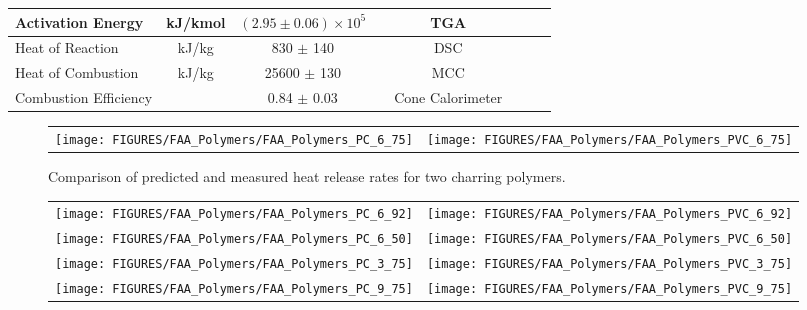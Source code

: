 \begin{table}[h!]
\begin{tabular}{|l|c|c|c|c|c|l|l|}
Activation Energy           & kJ/kmol       & $(2.95 \pm 0.06) \times 10^{5}$   &                       & TGA                   &  \cite{Stoliarov:CF2010}  \\ \hline
Heat of Reaction            & kJ/kg         & 830 $\pm$ 140                     &                       & DSC                   &  \cite{Stoliarov:PDS2008}  \\ \hline
Heat of Combustion          & kJ/kg         & 25600 $\pm$ 130                   &                       & MCC                   &  \cite{Stoliarov:CF2010}  \\ \hline
Combustion Efficiency       &               & 0.84 $\pm$ 0.03                   &                       & Cone Calorimeter      &  \cite{Stoliarov:CF2010}  \\ \hline
\end{tabular}
\label{FAA_Properties_Charring}
\end{table}

\begin{figure}[h!]
\begin{tabular*}{\textwidth}{l@{\extracolsep{\fill}}r}
\texttt{[image: FIGURES/FAA\_Polymers/FAA\_Polymers\_PC\_6\_75]} &
\texttt{[image: FIGURES/FAA\_Polymers/FAA\_Polymers\_PVC\_6\_75]}
\end{tabular*}
\caption[Results of FAA Polymers, charring, comparison]{Comparison of predicted and measured heat release rates for two charring polymers.}
\label{FAA_Polymers_Charring}
\end{figure}

\begin{figure}[p]
\begin{tabular*}{\textwidth}{l@{\extracolsep{\fill}}r}
\texttt{[image: FIGURES/FAA\_Polymers/FAA\_Polymers\_PC\_6\_92]} &
\texttt{[image: FIGURES/FAA\_Polymers/FAA\_Polymers\_PVC\_6\_92]}  \\
\texttt{[image: FIGURES/FAA\_Polymers/FAA\_Polymers\_PC\_6\_50]} &
\texttt{[image: FIGURES/FAA\_Polymers/FAA\_Polymers\_PVC\_6\_50]} \\
\texttt{[image: FIGURES/FAA\_Polymers/FAA\_Polymers\_PC\_3\_75]} &
\texttt{[image: FIGURES/FAA\_Polymers/FAA\_Polymers\_PVC\_3\_75]} \\
\texttt{[image: FIGURES/FAA\_Polymers/FAA\_Polymers\_PC\_9\_75]} &
\texttt{[image: FIGURES/FAA\_Polymers/FAA\_Polymers\_PVC\_9\_75]}
\end{tabular*}
\end{figure}
